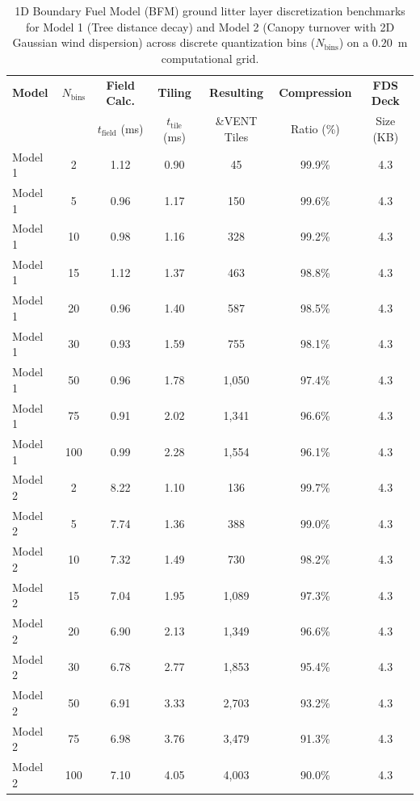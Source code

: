 \begin{table}[htbp]
\centering
\caption{1D Boundary Fuel Model (BFM) ground litter layer discretization benchmarks for Model 1 (Tree distance decay) and Model 2 (Canopy turnover with 2D Gaussian wind dispersion) across discrete quantization bins ($N_{\text{bins}}$) on a $0.20$~m computational grid.}
\label{tab:litter_scaling}
\small
\begin{tabular}{lcccccc}
\toprule
\textbf{Model} & $N_{\text{bins}}$ & \textbf{Field Calc.} & \textbf{Tiling} & \textbf{Resulting} & \textbf{Compression} & \textbf{FDS Deck} \\
& & $t_{\text{field}}$ (ms) & $t_{\text{tile}}$ (ms) & \&VENT Tiles & Ratio (\%) & Size (KB) \\
\midrule
Model 1 & 2 & 1.12 & 0.90 & 45 & 99.9\% & 4.3 \\
Model 1 & 5 & 0.96 & 1.17 & 150 & 99.6\% & 4.3 \\
Model 1 & 10 & 0.98 & 1.16 & 328 & 99.2\% & 4.3 \\
Model 1 & 15 & 1.12 & 1.37 & 463 & 98.8\% & 4.3 \\
Model 1 & 20 & 0.96 & 1.40 & 587 & 98.5\% & 4.3 \\
Model 1 & 30 & 0.93 & 1.59 & 755 & 98.1\% & 4.3 \\
Model 1 & 50 & 0.96 & 1.78 & 1,050 & 97.4\% & 4.3 \\
Model 1 & 75 & 0.91 & 2.02 & 1,341 & 96.6\% & 4.3 \\
Model 1 & 100 & 0.99 & 2.28 & 1,554 & 96.1\% & 4.3 \\
Model 2 & 2 & 8.22 & 1.10 & 136 & 99.7\% & 4.3 \\
Model 2 & 5 & 7.74 & 1.36 & 388 & 99.0\% & 4.3 \\
Model 2 & 10 & 7.32 & 1.49 & 730 & 98.2\% & 4.3 \\
Model 2 & 15 & 7.04 & 1.95 & 1,089 & 97.3\% & 4.3 \\
Model 2 & 20 & 6.90 & 2.13 & 1,349 & 96.6\% & 4.3 \\
Model 2 & 30 & 6.78 & 2.77 & 1,853 & 95.4\% & 4.3 \\
Model 2 & 50 & 6.91 & 3.33 & 2,703 & 93.2\% & 4.3 \\
Model 2 & 75 & 6.98 & 3.76 & 3,479 & 91.3\% & 4.3 \\
Model 2 & 100 & 7.10 & 4.05 & 4,003 & 90.0\% & 4.3 \\
\bottomrule
\end{tabular}
\end{table}
